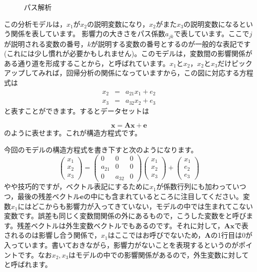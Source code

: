 \documentclass{ltjsbook}
\begin{document}
\begin{figure}[ht]
	\centering
	\caption{パス解析}
	\label{pathAnalysis}
\end{figure}

この分析モデルは，$x_1$が$x_2$の説明変数になり，$x_2$がまた$x_3$の説明変数になるという関係を表しています。
影響力の大きさをパス係数$a_{jk}$で表しています。ここで$j$が説明される変数の番号，$k$が説明する変数の番号とするのが一般的な表記です(これには少し慣れが必要かもしれません)。このモデルは，変数間の影響関係がある通り道を形成することから，と呼ばれています。$x_1$と$x_2$，$x_2$と$x_3$だけピックアップしてみれば，回帰分析の関係になっていますから，この図に対応する方程式は
\[
	\begin{array}{ccc}
		x_2 & = & a_{21}x_1 + e_2 \\
		x_3 & = & a_{32}x_2 + e_3
	\end{array}
\]
と表すことができます。するとデータセットは

\[ \bm{x} = \bm{Ax} + \bm{e} \]
のように表せます。これが構造方程式です。

今回のモデルの構造方程式を書き下すと次のようになります。
\[
	\begin{pmatrix} x_1 \\ x_2 \\ x_3 \end{pmatrix} =
	\begin{pmatrix} 0 & 0 & 0 \\ a_{21} & 0 & 0 \\ 0 & a_{32} & 0 \end{pmatrix}
	\begin{pmatrix} x_1 \\ x_2 \\ x_3 \end{pmatrix}+
	\begin{pmatrix} x_1 \\ e_2 \\ e_3 \end{pmatrix}
\]
やや技巧的ですが，ベクトル表記にするために$x_1$が係数行列にも加わっていつつ，最後の残差ベクトル$\bm{e}$の中にも含まれているところに注目してください。変数$x_1$にはどこからも影響力が入ってきていない，モデルの中では生まれてこない変数です。誤差も同じく変数間関係の外にあるもので，こうした変数をと呼びます。残差ベクトルは外生変数ベクトルでもあるのです。それに対して，$\bm{Ax}$で表されるのは影響し合う関係で，$x_1$はここではお呼びでないため，$\bm{A}$の1行目は$0$が入っています。書いておきながら，影響力がないことを表現するというのがポイントです。なお$x_2,x_3$はモデルの中での影響関係があるので，外生変数に対してと呼ばれます。
\end{document}
